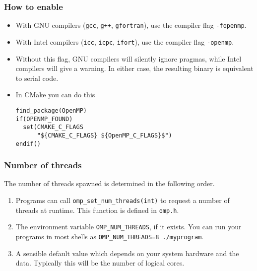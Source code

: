 \begin{frame}[fragile]
  \frametitle{How to enable}
  \begin{itemize}
  \item With GNU compilers (\texttt{gcc}, \texttt{g++}, \texttt{gfortran}), use
    the compiler flag \texttt{-fopenmp}.
  \item With Intel compilers (\texttt{icc}, \texttt{icpc}, \texttt{ifort}), use
    the compiler flag \texttt{-openmp}.
  \item Without this flag, GNU compilers will silently ignore pragmas, while
    Intel compilers will give a warning. In either case, the resulting binary is
    equivalent to serial code.
  \item In CMake you can do this
    \begin{lstlisting}[basicstyle=\ttfamily\footnotesize]
find_package(OpenMP)
if(OPENMP_FOUND)
  set(CMAKE_C_FLAGS
      "${CMAKE_C_FLAGS} ${OpenMP_C_FLAGS}$")
endif()
    \end{lstlisting}
  \end{itemize}
\end{frame}

\begin{frame}[fragile]
  \frametitle{Number of threads}
  The number of threads spawned is determined in the following order.
  \begin{enumerate}
  \item Programs can call \texttt{omp\_set\_num\_threads(int)} to request a number
    of threads at runtime. This function is defined in \texttt{omp.h}.
  \item The environment variable \texttt{OMP\_NUM\_THREADS}, if it exists. You can
    run your programs in most shells as
    \texttt{OMP\_NUM\_THREADS=8 ./myprogram}.
  \item A sensible default value which depends on your system hardware and the data.
    Typically this will be the number of logical cores.
  \end{enumerate}
\end{frame}

